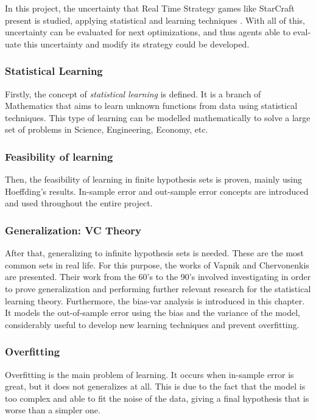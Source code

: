 \begin{otherlanguage}{british}

  In this project, the uncertainty that Real Time Strategy games like StarCraft present is studied, applying statistical and learning techniques . With all of this, uncertainty can be evaluated for next optimizations, and thus agents able to evaluate this uncertainty and modify its strategy could be developed.

  \subsubsection*{Statistical Learning}

  Firstly, the concept of \emph{statistical learning} is defined. It is a branch of Mathematics that aims to learn unknown functions from data using statistical techniques. This type of learning can be modelled mathematically to solve a large set of problems in Science, Engineering, Economy, etc.

  \subsubsection*{Feasibility of learning}
  Then, the feasibility of learning in finite hypothesis sets is proven, mainly using Hoeffding’s results. In-sample error and out-sample error concepts are introduced and used throughout  the entire project.

  \subsubsection*{Generalization: VC Theory}
  After that, generalizing to infinite hypothesis sets is needed. These are the most common sets in real life. For this purpose, the works of Vapnik and Chervonenkis are presented. Their work from the 60’s to the 90’s involved investigating in order to prove generalization and performing further relevant research for the statistical learning theory.
  Furthermore, the bias-var analysis is introduced in this chapter. It models the out-of-sample error using the bias and the variance of the model, considerably useful to develop new learning techniques and prevent overfitting.

  \subsubsection*{Overfitting}
  Overfitting is the main problem of learning. It occurs when in-sample error is great, but it does not generalizes at all. This is due to the fact that the model is too complex and able to fit the noise of the data, giving a final hypothesis that is worse than a simpler one.


\end{otherlanguage}
